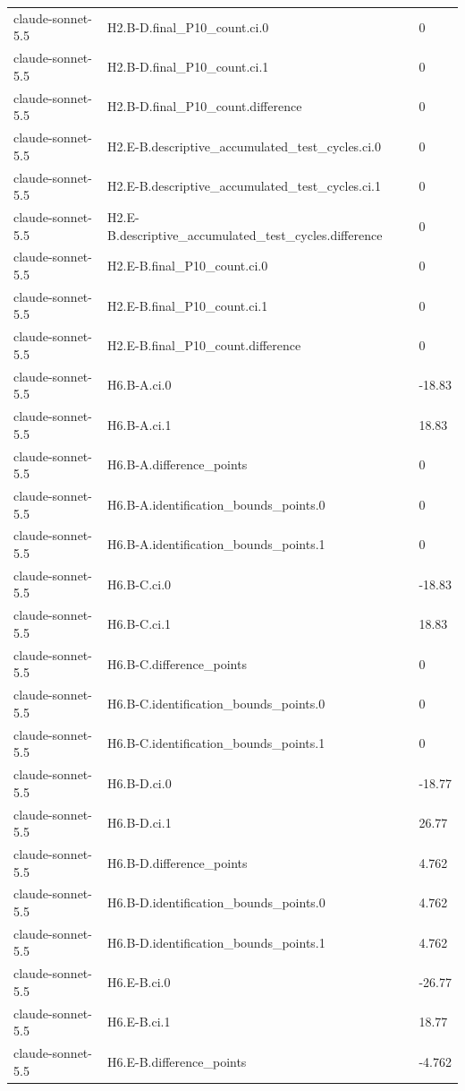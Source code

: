 \begin{tabular}{lll}
claude-sonnet-5.5 & H2.B-D.final\_P10\_count.ci.0 & 0 \\
claude-sonnet-5.5 & H2.B-D.final\_P10\_count.ci.1 & 0 \\
claude-sonnet-5.5 & H2.B-D.final\_P10\_count.difference & 0 \\
claude-sonnet-5.5 & H2.E-B.descriptive\_accumulated\_test\_cycles.ci.0 & 0 \\
claude-sonnet-5.5 & H2.E-B.descriptive\_accumulated\_test\_cycles.ci.1 & 0 \\
claude-sonnet-5.5 & H2.E-B.descriptive\_accumulated\_test\_cycles.difference & 0 \\
claude-sonnet-5.5 & H2.E-B.final\_P10\_count.ci.0 & 0 \\
claude-sonnet-5.5 & H2.E-B.final\_P10\_count.ci.1 & 0 \\
claude-sonnet-5.5 & H2.E-B.final\_P10\_count.difference & 0 \\
claude-sonnet-5.5 & H6.B-A.ci.0 & -18.83 \\
claude-sonnet-5.5 & H6.B-A.ci.1 & 18.83 \\
claude-sonnet-5.5 & H6.B-A.difference\_points & 0 \\
claude-sonnet-5.5 & H6.B-A.identification\_bounds\_points.0 & 0 \\
claude-sonnet-5.5 & H6.B-A.identification\_bounds\_points.1 & 0 \\
claude-sonnet-5.5 & H6.B-C.ci.0 & -18.83 \\
claude-sonnet-5.5 & H6.B-C.ci.1 & 18.83 \\
claude-sonnet-5.5 & H6.B-C.difference\_points & 0 \\
claude-sonnet-5.5 & H6.B-C.identification\_bounds\_points.0 & 0 \\
claude-sonnet-5.5 & H6.B-C.identification\_bounds\_points.1 & 0 \\
claude-sonnet-5.5 & H6.B-D.ci.0 & -18.77 \\
claude-sonnet-5.5 & H6.B-D.ci.1 & 26.77 \\
claude-sonnet-5.5 & H6.B-D.difference\_points & 4.762 \\
claude-sonnet-5.5 & H6.B-D.identification\_bounds\_points.0 & 4.762 \\
claude-sonnet-5.5 & H6.B-D.identification\_bounds\_points.1 & 4.762 \\
claude-sonnet-5.5 & H6.E-B.ci.0 & -26.77 \\
claude-sonnet-5.5 & H6.E-B.ci.1 & 18.77 \\
claude-sonnet-5.5 & H6.E-B.difference\_points & -4.762 \\

\end{tabular}
